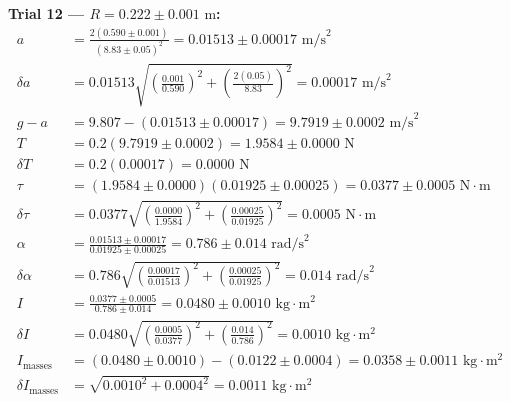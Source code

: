 \documentclass[11pt]{article}
\begin{document}
\textbf{Trial 12 — $R = 0.222 \pm 0.001\text{ m}$:}
\begin{align*}
a &= \frac{2(0.590 \pm 0.001)}{(8.83 \pm 0.05)^2} = 0.01513 \pm 0.00017\text{ m/s}^2 \\
\delta a &= 0.01513\sqrt{\left(\frac{0.001}{0.590}\right)^2 + \left(\frac{2(0.05)}{8.83}\right)^2} = 0.00017\text{ m/s}^2 \\
g - a &= 9.807 - (0.01513 \pm 0.00017) = 9.7919 \pm 0.0002\text{ m/s}^2 \\
T &= 0.2(9.7919 \pm 0.0002) = 1.9584 \pm 0.0000\text{ N} \\
\delta T &= 0.2(0.00017) = 0.0000\text{ N} \\
\tau &= (1.9584 \pm 0.0000)(0.01925 \pm 0.00025) = 0.0377 \pm 0.0005\text{ N}\cdot\text{m} \\
\delta\tau &= 0.0377\sqrt{\left(\frac{0.0000}{1.9584}\right)^2 + \left(\frac{0.00025}{0.01925}\right)^2} = 0.0005\text{ N}\cdot\text{m} \\
\alpha &= \frac{0.01513 \pm 0.00017}{0.01925 \pm 0.00025} = 0.786 \pm 0.014\text{ rad/s}^2 \\
\delta\alpha &= 0.786\sqrt{\left(\frac{0.00017}{0.01513}\right)^2 + \left(\frac{0.00025}{0.01925}\right)^2} = 0.014\text{ rad/s}^2 \\
I &= \frac{0.0377 \pm 0.0005}{0.786 \pm 0.014} = 0.0480 \pm 0.0010\text{ kg}\cdot\text{m}^2 \\
\delta I &= 0.0480\sqrt{\left(\frac{0.0005}{0.0377}\right)^2 + \left(\frac{0.014}{0.786}\right)^2} = 0.0010\text{ kg}\cdot\text{m}^2 \\
I_{\text{masses}} &= (0.0480 \pm 0.0010) - (0.0122 \pm 0.0004) = 0.0358 \pm 0.0011\text{ kg}\cdot\text{m}^2 \\
\delta I_{\text{masses}} &= \sqrt{0.0010^2 + 0.0004^2} = 0.0011\text{ kg}\cdot\text{m}^2
\end{align*}
\end{document}
